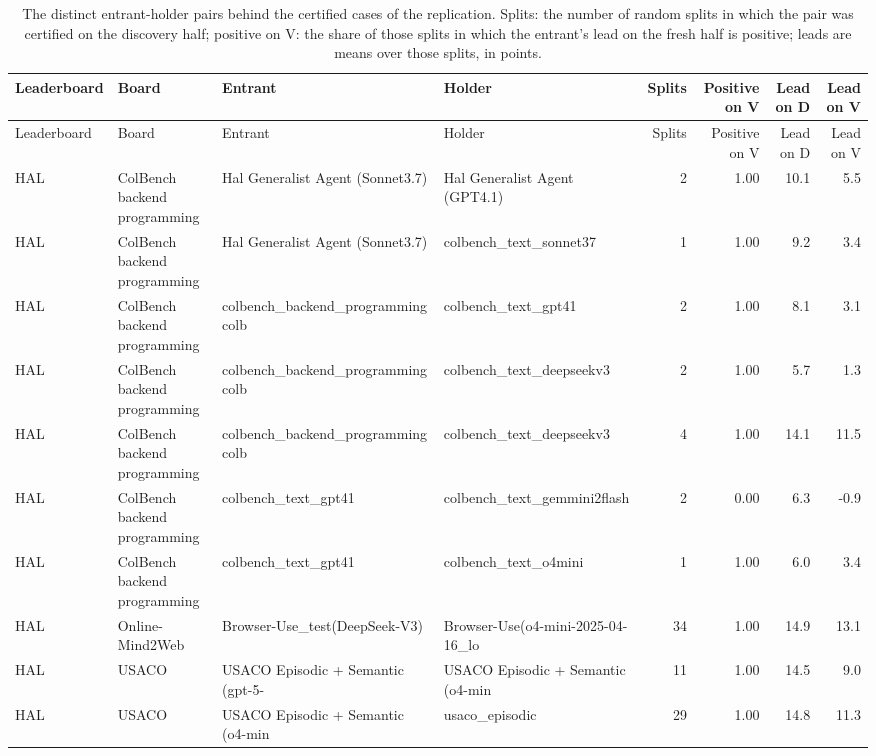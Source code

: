 \begin{longtable}{lp{2.4cm}p{3.5cm}p{3.5cm}rrrr}
\caption{The distinct entrant-holder pairs behind the certified cases of the replication. Splits: the number of random splits in which the pair was certified on the discovery half; positive on V: the share of those splits in which the entrant's lead on the fresh half is positive; leads are means over those splits, in points.}\label{tab:supp-replication-pairs}\\
\toprule
Leaderboard & Board & Entrant & Holder & Splits & Positive on V & Lead on D & Lead on V \\
\midrule
\endfirsthead
\toprule
Leaderboard & Board & Entrant & Holder & Splits & Positive on V & Lead on D & Lead on V \\
\midrule
\endhead
\bottomrule
\endfoot
HAL & ColBench backend programming & Hal Generalist Agent (Sonnet3.7) & Hal Generalist Agent (GPT4.1) & 2 & 1.00 & 10.1 & 5.5 \\
HAL & ColBench backend programming & Hal Generalist Agent (Sonnet3.7) & colbench\_\allowbreak text\_\allowbreak sonnet37 & 1 & 1.00 & 9.2 & 3.4 \\
HAL & ColBench backend programming & colbench\_\allowbreak backend\_\allowbreak programming colb~ & colbench\_\allowbreak text\_\allowbreak gpt41 & 2 & 1.00 & 8.1 & 3.1 \\
HAL & ColBench backend programming & colbench\_\allowbreak backend\_\allowbreak programming colb~ & colbench\_\allowbreak text\_\allowbreak deepseekv3 & 2 & 1.00 & 5.7 & 1.3 \\
HAL & ColBench backend programming & colbench\_\allowbreak backend\_\allowbreak programming colb~ & colbench\_\allowbreak text\_\allowbreak deepseekv3 & 4 & 1.00 & 14.1 & 11.5 \\
HAL & ColBench backend programming & colbench\_\allowbreak text\_\allowbreak gpt41 & colbench\_\allowbreak text\_\allowbreak gemmini2flash & 2 & 0.00 & 6.3 & -0.9 \\
HAL & ColBench backend programming & colbench\_\allowbreak text\_\allowbreak gpt41 & colbench\_\allowbreak text\_\allowbreak o4mini & 1 & 1.00 & 6.0 & 3.4 \\
HAL & Online-Mind2Web & Browser-Use\_\allowbreak test(DeepSeek-V3) & Browser-Use(o4-mini-2025-04-16\_\allowbreak lo~ & 34 & 1.00 & 14.9 & 13.1 \\
HAL & USACO & USACO Episodic + Semantic (gpt-5-~ & USACO Episodic + Semantic (o4-min~ & 11 & 1.00 & 14.5 & 9.0 \\
HAL & USACO & USACO Episodic + Semantic (o4-min~ & usaco\_\allowbreak episodic & 29 & 1.00 & 14.8 & 11.3 \\

\end{longtable}
